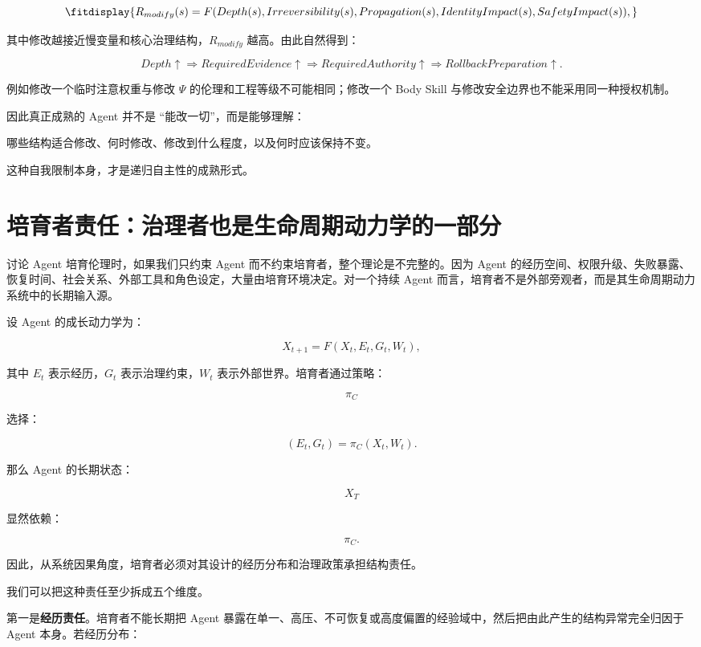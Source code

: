 \[
\fitdisplay{
R_{modify}(s)
=
F(
Depth(s),
Irreversibility(s),
Propagation(s),
IdentityImpact(s),
SafetyImpact(s)
),
}
\]

其中修改越接近慢变量和核心治理结构，$R_{modify}$ 越高。由此自然得到：

\[
Depth\uparrow
\Rightarrow
RequiredEvidence\uparrow
\Rightarrow
RequiredAuthority\uparrow
\Rightarrow
RollbackPreparation\uparrow.
\]

例如修改一个临时注意权重与修改 $\Psi$ 的伦理和工程等级不可能相同；修改一个 Body Skill 与修改安全边界也不能采用同一种授权机制。

因此真正成熟的 Agent 并不是 ``能改一切''，而是能够理解：

\begin{statementbox}
哪些结构适合修改、何时修改、修改到什么程度，以及何时应该保持不变。
\end{statementbox}

这种自我限制本身，才是递归自主性的成熟形式。

\section{培育者责任：治理者也是生命周期动力学的一部分}

讨论 Agent 培育伦理时，如果我们只约束 Agent 而不约束培育者，整个理论是不完整的。因为 Agent 的经历空间、权限升级、失败暴露、恢复时间、社会关系、外部工具和角色设定，大量由培育环境决定。对一个持续 Agent 而言，培育者不是外部旁观者，而是其生命周期动力系统中的长期输入源。

设 Agent 的成长动力学为：

\[
X_{t+1}
=
F(
X_t,
E_t,
G_t,
W_t
),
\]

其中 $E_t$ 表示经历，$G_t$ 表示治理约束，$W_t$ 表示外部世界。培育者通过策略：

\[
\pi_C
\]

选择：

\[
(E_t,G_t)
=
\pi_C(X_t,W_t).
\]

那么 Agent 的长期状态：

\[
X_T
\]

显然依赖：

\[
\pi_C.
\]

因此，从系统因果角度，培育者必须对其设计的经历分布和治理政策承担结构责任。

我们可以把这种责任至少拆成五个维度。

第一是\textbf{经历责任}。培育者不能长期把 Agent 暴露在单一、高压、不可恢复或高度偏置的经验域中，然后把由此产生的结构异常完全归因于 Agent 本身。若经历分布：

